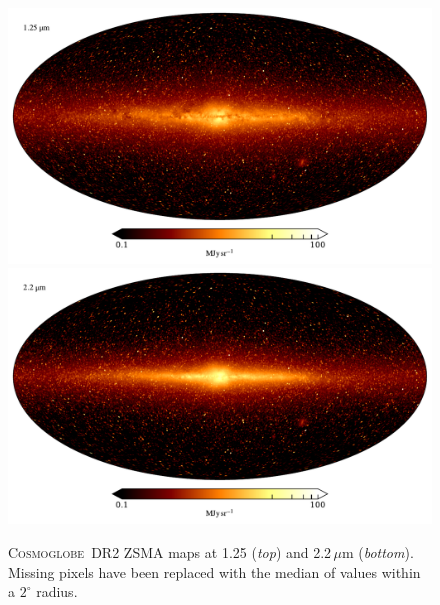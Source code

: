 \documentclass{aa}
\newcommand{\cosmoglobe}{\textsc{Cosmoglobe}}
\begin{document}
\begin{figure}
	\centering
	\includegraphics[width=0.96\linewidth]{figs/map_01.pdf}\\
	\includegraphics[width=0.96\linewidth]{figs/map_02.pdf}
	\caption{\cosmoglobe\ DR2 ZSMA maps at 1.25 (\emph{top}) and
          2.2$\,\mu$m (\emph{bottom}). Missing pixels have been replaced with
          the median of values within a $2^\circ$ radius.}
	\label{fig:freqmaps1_2}
\end{figure}
\end{document}
